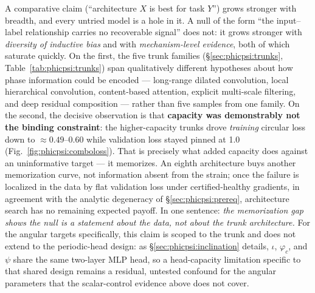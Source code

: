 \documentclass[11pt]{article}
\begin{document}
A comparative claim (``architecture $X$ is best for task $Y$'') grows stronger with breadth, and every untried model is a hole in it.
A null of the form ``the input--label relationship carries no recoverable signal'' does not: it grows stronger with \emph{diversity of inductive bias} and with \emph{mechanism-level evidence}, both of which saturate quickly.
On the first, the five trunk families (\S\ref{sec:phicpsi:trunks}, Table~\ref{tab:phicpsi:trunks}) span qualitatively different hypotheses about how phase information could be encoded --- long-range dilated convolution, local hierarchical convolution, content-based attention, explicit multi-scale filtering, and deep residual composition --- rather than five samples from one family.
On the second, the decisive observation is that \textbf{capacity was demonstrably not the binding constraint}: the higher-capacity trunks drove \emph{training} circular loss down to ${\approx}0.49$--$0.60$ while validation loss stayed pinned at 1.0 (Fig.~\ref{fig:phicpsi:comboloss}).
That is precisely what added capacity does against an uninformative target --- it memorizes.
An eighth architecture buys another memorization curve, not information absent from the strain; once the failure is localized in the data by flat validation loss under certified-healthy gradients, in agreement with the analytic degeneracy of \S\ref{sec:phicpsi:prereq}, architecture search has no remaining expected payoff.
In one sentence: \emph{the memorization gap shows the null is a statement about the data, not about the trunk architecture.}
For the angular targets specifically, this claim is scoped to the trunk and does not extend to the periodic-head design: as \S\ref{sec:phicpsi:inclination} details, $\iota$, $\varphi_c$, and $\psi$ share the same two-layer MLP head, so a head-capacity limitation specific to that shared design remains a residual, untested confound for the angular parameters that the scalar-control evidence above does not cover.
\end{document}
